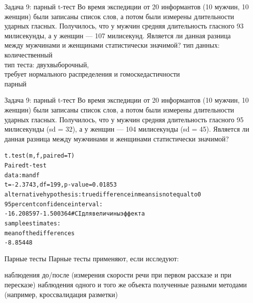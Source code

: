 \begin{frame}{Задача 9: парный t-тест}
Во время экспедиции от 20 информантов (10 мужчин, 10 женщин) были записаны список слов, а потом были измерены длительности ударных гласных. Получилось, что у мужчин средняя длительность гласного  93 милисекунды, а у женщин — 107 милисекунд. Является ли данная разница между мужчинами и женщинами статистически значимой?
\vfill
тип данных: количественный\\
тип теста: двухвыборочный,\\
требует нормального распределения и гомоскедастичности\\
парный
\end{frame}
\begin{frame}{Задача 9: парный t-тест}
Во время экспедиции от 20 информантов (10 мужчин, 10 женщин) были записаны список слов, а потом были измерены длительности ударных гласных. Получилось, что у мужчин средняя длительность гласного  95 милисекунды (sd = 32), а у женщин — 104 милисекунды (sd = 45). Является ли данная разница между мужчинами и женщинами статистически значимой?
\vfill
\scriptsize
\begin{alltt}
\alert{t.test(m, f, paired = T)}\medskip\\
Paired t-test\\
data:  m and f\\
\alert{t = -2.3743, df = 199, p-value = 0.01853}\\
alternative hypothesis: true difference in means is not equal to 0\\
95 percent confidence interval:\\
 -16.208597  -1.500364 \hfill \# CI для величины эффекта\\
sample estimates:\\
mean of the differences\\
-8.85448
\end{alltt}
\normalsize
\end{frame}
\begin{frame}{Парные тесты}
Парные тесты применяют, если исследуют:
\begin{itemize}
\mytem наблюдения до/после (измерения скорости речи при первом рассказе и при пересказе)
\mytem наблюдения одного и того же объекта полученные разными методами (например, кроссвалидация разметки)
\end{itemize}
\end{frame}
